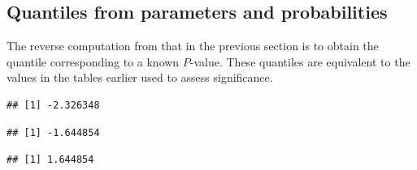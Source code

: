 \documentclass[krantz2]{krantz}\usepackage{knitr}%
\begin{document}
\subsection{Quantiles from parameters and probabilities}\label{sec:quant:prob}

The reverse computation from that in the previous section is to obtain the quantile corresponding to a known $P$-value. These quantiles are equivalent to the values in the tables earlier used to assess significance.

\begin{knitrout}\footnotesize
{}\color{fgcolor}\begin{kframe}
\begin{alltt}
\hlstd{(} \hlstd{=} \hlstd{,}  \hlstd{=} \hlstd{,}  \hlstd{=} \hlstd{)}
\end{alltt}
\begin{verbatim}
## [1] -2.326348
\end{verbatim}
\begin{alltt}
\hlstd{(} \hlstd{=} \hlstd{,}  \hlstd{=} \hlstd{,}  \hlstd{=} \hlstd{)}
\end{alltt}
\begin{verbatim}
## [1] -1.644854
\end{verbatim}
\begin{alltt}
\hlstd{(} \hlstd{=} \hlstd{,}  \hlstd{=} \hlstd{,}  \hlstd{=} \hlstd{,}  \hlstd{=} \hlstd{)}
\end{alltt}
\begin{verbatim}
## [1] 1.644854
\end{verbatim}
\end{kframe}
\end{knitrout}
\end{document}
